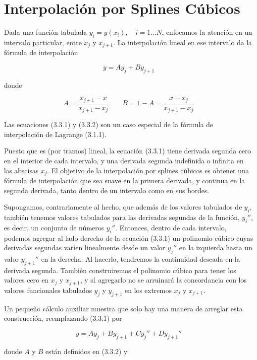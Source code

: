 \documentclass[10pt,a4paper]{book}
\begin{document}
\newpage

\section{Interpolación por Splines Cúbicos}

Dada una función tabulada \( y_i = y(x_i), \quad i = 1\ldots N \), enfocamos la atención en un intervalo particular, entre \( x_j \) y \( x_{j+1} \). La interpolación lineal en ese intervalo da la fórmula de interpolación

\[
y = A y_j + B y_{j+1} \tag{3.3.1}
\]

donde

\[
A = \frac{x_{j+1} - x}{x_{j+1} - x_j} \qquad B = 1 - A = \frac{x - x_j}{x_{j+1} - x_j} \tag{3.3.2}
\]

Las ecuaciones (3.3.1) y (3.3.2) son un caso especial de la fórmula de interpolación de Lagrange (3.1.1).

Puesto que es (por tramos) lineal, la ecuación (3.3.1) tiene derivada segunda cero en el interior de cada intervalo, y una derivada segunda indefinida o infinita en las abscisas \( x_j \). El objetivo de la interpolación por splines cúbicos es obtener una fórmula de interpolación que sea suave en la primera derivada, y continua en la segunda derivada, tanto dentro de un intervalo como en sus bordes.

Supongamos, contrariamente al hecho, que además de los valores tabulados de \( y_i \), también tenemos valores tabulados para las derivadas segundas de la función, \( y_i'' \), es decir, un conjunto de números \( y_i'' \). Entonces, dentro de cada intervalo, podemos agregar al lado derecho de la ecuación (3.3.1) un polinomio cúbico cuyas derivadas segundas varíen linealmente desde un valor \( y_j'' \) en la izquierda hasta un valor \( y_{j+1}'' \) en la derecha. Al hacerlo, tendremos la continuidad deseada en la derivada segunda. También construiremos el polinomio cúbico para tener los valores cero en \( x_j \) y \( x_{j+1} \), y al agregarlo no se arruinará la concordancia con los valores funcionales tabulados \( y_j \) y \( y_{j+1} \) en los extremos \( x_j \) y \( x_{j+1} \).

Un pequeño cálculo auxiliar muestra que solo hay una manera de arreglar esta construcción, reemplazando (3.3.1) por

\[
y = A y_j + B y_{j+1} + C y_j'' + D y_{j+1}'' \tag{3.3.3}
\]

donde \( A \) y \( B \) están definidos en (3.3.2) y
\end{document}
